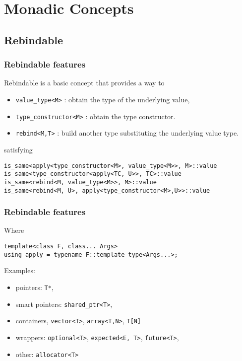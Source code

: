 \documentclass[xcolor=dvipsnames]{beamer}
\newcommand{\cpp}[1]{\lstinline{#1}}
\begin{document}
\section{Monadic Concepts}
\subsection{Rebindable}

\begin{frame}[fragile]
\frametitle{Rebindable features}

Rebindable is a basic concept that provides a way to

\begin{itemize}
  \item \cpp{value_type<M>} : obtain the type of the underlying value, 
  \item \cpp{type_constructor<M>} : obtain the type constructor. 
  \item \cpp{rebind<M,T>} : build another type substituting the underlying value type. 
\end{itemize}

satisfying 

\begin{lstlisting}
is_same<apply<type_constructor<M>, value_type<M>>, M>::value
is_same<type_constructor<apply<TC, U>>, TC>::value
is_same<rebind<M, value_type<M>>, M>::value
is_same<rebind<M, U>, apply<type_constructor<M>,U>>::value
\end{lstlisting}

\end{frame}
\begin{frame}[fragile]
\frametitle{Rebindable features}

Where

\begin{lstlisting}
template<class F, class... Args>
using apply = typename F::template type<Args...>;
\end{lstlisting}

Examples:
\begin{itemize}
  \item pointers:  \cpp{T*}, 
  \item smart pointers: \cpp{shared_ptr<T>}, 
  \item containers, \cpp{vector<T>},  \cpp{array<T,N>},  \cpp{T[N]} 
  \item wrappers: \cpp{optional<T>}, \cpp{expected<E, T>}, \cpp{future<T>},
  \item other: \cpp{allocator<T>}   
\end{itemize}

\end{frame}
\end{document}
